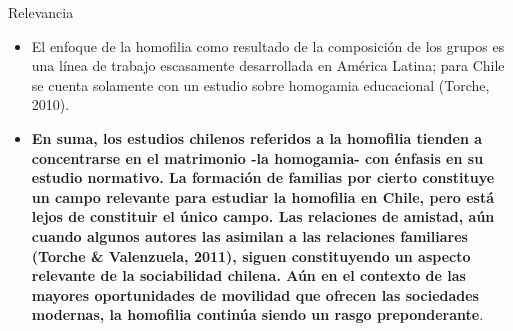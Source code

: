 \documentclass[
  8pt,
  ignorenonframetext,
]{beamer}
\begin{document}
\begin{frame}{Relevancia}
\protect\hypertarget{relevancia-1}{}
\begin{itemize}
\item
  El enfoque de la homofilia como resultado de la composición de los
  grupos es una línea de trabajo escasamente desarrollada en América
  Latina; para Chile se cuenta solamente con un estudio sobre homogamia
  educacional (Torche, 2010).
\item
  \textbf{En suma, los estudios chilenos referidos a la homofilia
  tienden a concentrarse en el matrimonio -la homogamia- con énfasis en
  su estudio normativo. La formación de familias por cierto constituye
  un campo relevante para estudiar la homofilia en Chile, pero está
  lejos de constituir el único campo. Las relaciones de amistad, aún
  cuando algunos autores las asimilan a las relaciones familiares
  (Torche \& Valenzuela, 2011), siguen constituyendo un aspecto
  relevante de la sociabilidad chilena. Aún en el contexto de las
  mayores oportunidades de movilidad que ofrecen las sociedades
  modernas, la homofilia continúa siendo un rasgo preponderante}.
\end{itemize}
\end{frame}
\end{document}

